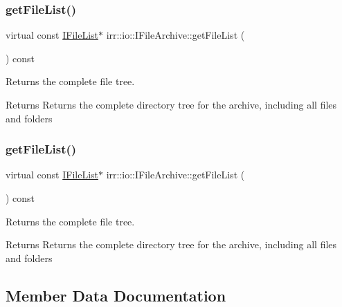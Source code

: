 \subsubsection{\texorpdfstring{get\+File\+List()}{getFileList()}\hspace{0.1cm}{\footnotesize\ttfamily [1/2]}}
{\footnotesize\ttfamily virtual const \hyperlink{classirr_1_1io_1_1IFileList}{I\+File\+List}$\ast$ irr\+::io\+::\+I\+File\+Archive\+::get\+File\+List (\begin{DoxyParamCaption}{ }\end{DoxyParamCaption}) const\hspace{0.3cm}{\ttfamily [pure virtual]}}



Returns the complete file tree. 

\begin{DoxyReturn}{Returns}
Returns the complete directory tree for the archive, including all files and folders 
\end{DoxyReturn}
\mbox{\label{classirr_1_1io_1_1IFileArchive_a73c683318837b13d16843373da00ded3}} 
\subsubsection{\texorpdfstring{get\+File\+List()}{getFileList()}\hspace{0.1cm}{\footnotesize\ttfamily [2/2]}}
{\footnotesize\ttfamily virtual const \hyperlink{classirr_1_1io_1_1IFileList}{I\+File\+List}$\ast$ irr\+::io\+::\+I\+File\+Archive\+::get\+File\+List (\begin{DoxyParamCaption}{ }\end{DoxyParamCaption}) const\hspace{0.3cm}{\ttfamily [pure virtual]}}



Returns the complete file tree. 

\begin{DoxyReturn}{Returns}
Returns the complete directory tree for the archive, including all files and folders 
\end{DoxyReturn}


\subsection{Member Data Documentation}
\mbox{\label{classirr_1_1io_1_1IFileArchive_ae5b574864226b09c70518e163e59b6ba}} 
